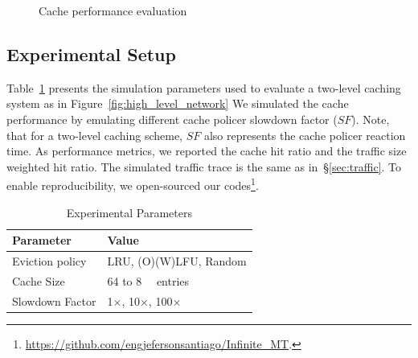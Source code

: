 \begin{figure}[]
{\label{fig:weighted_hit_ratio_sf1}
}
\caption{Cache performance evaluation}
\label{fig:hit_ratio}
\end{figure}


\subsection{Experimental Setup}
Table~\ref{tab:setup} presents the simulation parameters used to evaluate a two-level caching system as in Figure~\ref{fig:high_level_network}
We simulated the cache performance by emulating different cache policer slowdown factor ($SF$).
Note, that for a two-level caching scheme, $SF$ also represents the cache policer reaction time.
As performance metrics, we reported the cache hit ratio and the traffic size weighted hit ratio.
The simulated traffic trace is the same as in~\S\ref{sec:traffic}.
To enable reproducibility, we open-sourced our codes\footnote{\url{https://github.com/engjefersonsantiago/Infinite_MT}.}.


\begin{table}[h]
	\centering
	\caption{Experimental Parameters}
	\label{tab:setup}
	\begin{tabular}{|l|l|}
		\hline
		\textbf{Parameter}       & \textbf{Value}   \\
		\hline
		Eviction policy            & LRU, (O)(W)LFU, Random			    \\
		Cache Size              & 64 to \SI{8}{\kilo\nothing} entries  \\
		Slowdown Factor         & 1$\times$, 10$\times$, 100$\times$        \\
		\hline
	\end{tabular}
\end{table}

